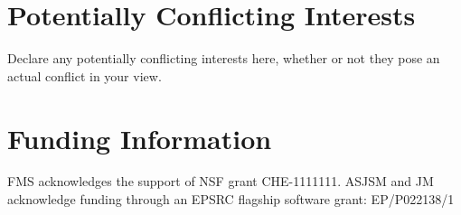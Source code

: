 \documentclass[9pt,bestpractices]{livecoms}
\begin{document}
\section*{Potentially Conflicting Interests}

Declare any potentially conflicting interests here, whether or not they pose an actual conflict in your view.

\section*{Funding Information}
FMS acknowledges the support of NSF grant CHE-1111111.
ASJSM and JM acknowledge funding through an EPSRC flagship software grant: EP/P022138/1




\end{document}
